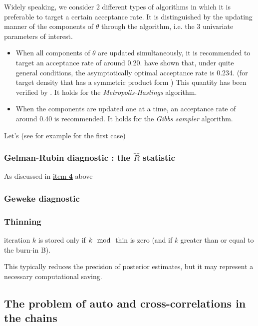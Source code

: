 \documentclass[11pt,a4paper,openany ]{book}
\begin{document}
Widely speaking, we consider 2 different  types of algorithms in which it is preferable to target a certain acceptance rate. It is distinguished by the updating manner of the components of $\theta$ through the algorithm, i.e. the 3 univariate parameters of interest.


\begin{itemize}
	\item When all components of $\theta$ are updated simultaneously, it is recommended to target an acceptance rate of around 0.20.
	 \citet{Roberts_weak_1997} have shown that, under quite general conditions, the asymptotically optimal acceptance rate is 0.234. (for  target density that has a symmetric product form ) 
	This quantity has been verified by \citet{Sherlock_optimal_2009}. It holds for the \emph{Metropolis-Hastings} algorithm.
	
	\item When the components are updated one at a time, an acceptance rate of around 0.40 is recommended. It holds for the\emph{ Gibbs sampler} algorithm. 
\end{itemize}

Let's  (see \citet{Bédard_optimal_2008} for example for the first case)



\subsubsection*{Gelman-Rubin diagnostic : the $\hat{R}$ statistic}

As discussed in \hyperref[convdiag4]{item \textbf{4}} above

\subsubsection*{Geweke diagnostic}



\subsubsection*{Thinning}

iteration $k$ is stored only if $k \mod$ thin is zero (and if $k$ greater than or equal to the burn-in B).

This typically reduces the precision of posterior estimates, but it may represent a necessary computational saving.


\subsection{The problem of auto and cross-correlations in the chains}
\end{document}
